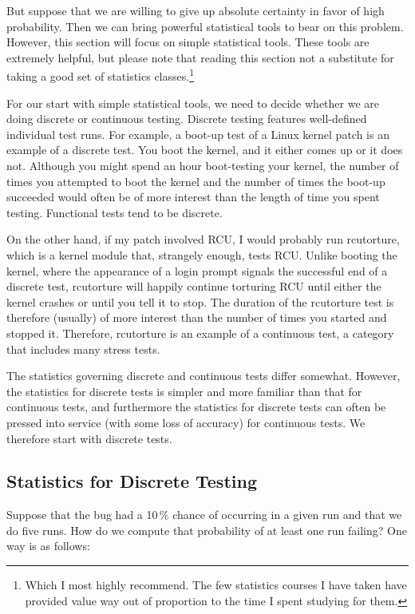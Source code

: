 But suppose that we are willing to give up absolute certainty in favor
of high probability.
Then we can bring powerful statistical tools to bear on this problem.
However, this section will focus on simple statistical tools.
These tools are extremely helpful, but please note
that reading this section not a substitute
for taking a good set of statistics classes.\footnote{
	Which I most highly recommend.
	The few statistics courses I have taken have provided value
	way out of proportion to the time I spent studying for them.}

For our start with simple statistical tools, we need to decide whether
we are doing discrete or continuous testing.
Discrete testing features well-defined individual test runs.
For example, a boot-up test of a Linux kernel patch is an example
of a discrete test.
You boot the kernel, and it either comes up or it does not.
Although you might spend an hour boot-testing your kernel, the number of
times you attempted to boot the kernel and the number of times the
boot-up succeeded would often be of more interest than the length
of time you spent testing.
Functional tests tend to be discrete.

On the other hand, if my patch involved RCU, I would probably run
rcutorture, which is a kernel module that, strangely enough, tests RCU.
Unlike booting the kernel, where the appearance of a login prompt
signals the successful end of a discrete test, rcutorture will happily
continue torturing RCU until either the kernel crashes or until you
tell it to stop.
The duration of the rcutorture test is therefore (usually) of more
interest than the number of times you started and stopped it.
Therefore, rcutorture is an example of a continuous test, a category
that includes many stress tests.

The statistics governing discrete and continuous tests differ somewhat.
However, the statistics for discrete tests is simpler and more
familiar than that for continuous tests, and furthermore the
statistics for discrete tests can often be pressed into service
(with some loss of accuracy) for continuous tests.
We therefore start with discrete tests.

\subsection{Statistics for Discrete Testing}
\label{sec:debugging:Statistics for Discrete Testing}

Suppose that the bug had a 10\,\% chance of occurring in
a given run and that we do five runs.
How do we compute that probability of at least one run failing?
One way is as follows:

